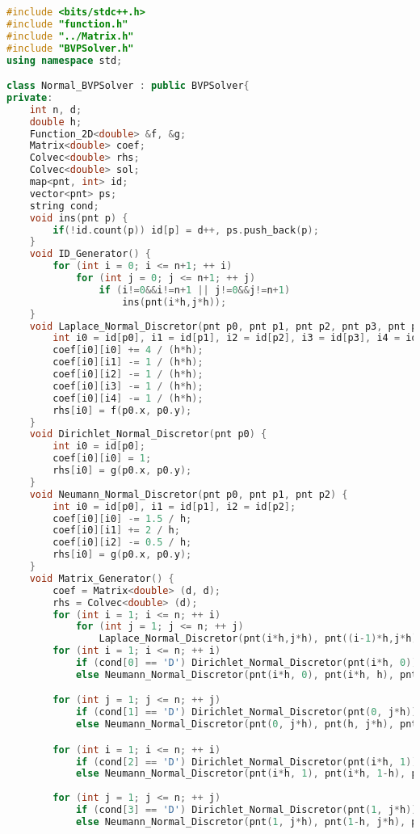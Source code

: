 \documentclass{ctexart}
\begin{document}
\begin{lstlisting}[language={c++}]
#include <bits/stdc++.h>
#include "function.h"
#include "../Matrix.h"
#include "BVPSolver.h"
using namespace std;

class Normal_BVPSolver : public BVPSolver{
private:
    int n, d;
    double h;
    Function_2D<double> &f, &g;
    Matrix<double> coef;
    Colvec<double> rhs;
    Colvec<double> sol;
    map<pnt, int> id;
    vector<pnt> ps;
    string cond;
    void ins(pnt p) {
        if(!id.count(p)) id[p] = d++, ps.push_back(p);
    }
    void ID_Generator() {
        for (int i = 0; i <= n+1; ++ i)
            for (int j = 0; j <= n+1; ++ j)
                if (i!=0&&i!=n+1 || j!=0&&j!=n+1)
                    ins(pnt(i*h,j*h));
    }
    void Laplace_Normal_Discretor(pnt p0, pnt p1, pnt p2, pnt p3, pnt p4) {
        int i0 = id[p0], i1 = id[p1], i2 = id[p2], i3 = id[p3], i4 = id[p4];
        coef[i0][i0] += 4 / (h*h);
        coef[i0][i1] -= 1 / (h*h);
        coef[i0][i2] -= 1 / (h*h);
        coef[i0][i3] -= 1 / (h*h);
        coef[i0][i4] -= 1 / (h*h);
        rhs[i0] = f(p0.x, p0.y);
    }
    void Dirichlet_Normal_Discretor(pnt p0) {
        int i0 = id[p0];
        coef[i0][i0] = 1;
        rhs[i0] = g(p0.x, p0.y);
    }
    void Neumann_Normal_Discretor(pnt p0, pnt p1, pnt p2) {
        int i0 = id[p0], i1 = id[p1], i2 = id[p2];
        coef[i0][i0] -= 1.5 / h;
        coef[i0][i1] += 2 / h;
        coef[i0][i2] -= 0.5 / h;
        rhs[i0] = g(p0.x, p0.y);
    }
    void Matrix_Generator() {
        coef = Matrix<double> (d, d);
        rhs = Colvec<double> (d);
        for (int i = 1; i <= n; ++ i)
            for (int j = 1; j <= n; ++ j) 
                Laplace_Normal_Discretor(pnt(i*h,j*h), pnt((i-1)*h,j*h), pnt((i+1)*h,j*h), pnt(i*h,(j-1)*h), pnt(i*h,(j+1)*h));
        for (int i = 1; i <= n; ++ i)
            if (cond[0] == 'D') Dirichlet_Normal_Discretor(pnt(i*h, 0));
            else Neumann_Normal_Discretor(pnt(i*h, 0), pnt(i*h, h), pnt(i*h, 2*h));

        for (int j = 1; j <= n; ++ j)
            if (cond[1] == 'D') Dirichlet_Normal_Discretor(pnt(0, j*h));
            else Neumann_Normal_Discretor(pnt(0, j*h), pnt(h, j*h), pnt(2*h, j*h));

        for (int i = 1; i <= n; ++ i)
            if (cond[2] == 'D') Dirichlet_Normal_Discretor(pnt(i*h, 1));
            else Neumann_Normal_Discretor(pnt(i*h, 1), pnt(i*h, 1-h), pnt(i*h, 1-2*h));
            
        for (int j = 1; j <= n; ++ j)
            if (cond[3] == 'D') Dirichlet_Normal_Discretor(pnt(1, j*h));
            else Neumann_Normal_Discretor(pnt(1, j*h), pnt(1-h, j*h), pnt(1-2*h, j*h));
        

\end{lstlisting}
\end{document}
